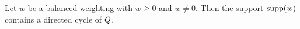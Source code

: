 \begin{lemma}[Support]\label{sh-0006}
Let $w$ be a balanced weighting with $w \geq 0$ and $w \neq 0$. Then the support $\operatorname{supp}(w)$ contains a directed cycle of $Q$.
\end{lemma}